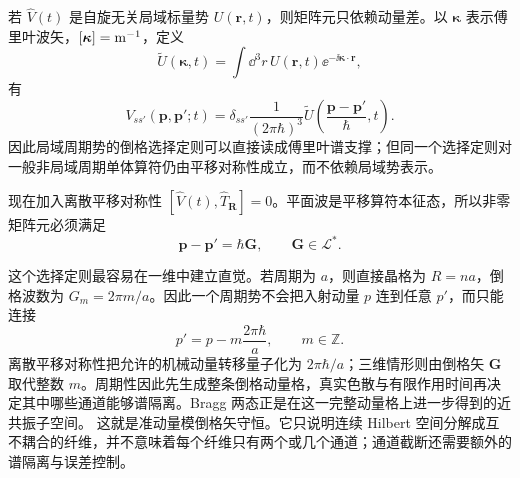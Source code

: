 若 $\hat V(t)$ 是自旋无关局域标量势 $U(\mathbf r,t)$，则矩阵元只依赖动量差。以 $\boldsymbol\kappa$ 表示傅里叶波矢，$[\boldsymbol\kappa]={\rm m^{-1}}$，定义
\begin{equation*}
\widetilde U(\boldsymbol\kappa,t)=\int\dd^3 r\,U(\mathbf r,t)\ee^{-\ii\boldsymbol\kappa\cdot\mathbf r},
\end{equation*}
有
\begin{equation*}
V_{ss'}(\mathbf p,\mathbf p';t)
=\delta_{ss'}\frac{1}{(2\pi\hbar)^3}
\widetilde U\!\left(\frac{\mathbf p-\mathbf p'}{\hbar},t\right).
\end{equation*}
因此局域周期势的倒格选择定则可以直接读成傅里叶谱支撑；但同一个选择定则对一般非局域周期单体算符仍由平移对称性成立，而不依赖局域势表示。

现在加入离散平移对称性 $[\hat V(t),\hat T_{\mathbf R}]=0$。平面波是平移算符本征态，所以非零矩阵元必须满足
\begin{equation}
\boxed{
\mathbf p-\mathbf p'=\hbar\mathbf G,
\qquad
\mathbf G\in\mathcal L^*.}
\label{eq:periodic_momentum_selection_rule}
\end{equation}

这个选择定则最容易在一维中建立直觉。若周期为 $a$，则直接晶格为 $R=na$，倒格波数为 $G_m=2\pi m/a$。因此一个周期势不会把入射动量 $p$ 连到任意 $p'$，而只能连接
\[
 p'=p-m\frac{2\pi\hbar}{a},\qquad m\in\mathbb Z.
\]
离散平移对称性把允许的机械动量转移量子化为 $2\pi\hbar/a$；三维情形则由倒格矢 $\mathbf G$ 取代整数 $m$。周期性因此先生成整条倒格动量格，真实色散与有限作用时间再决定其中哪些通道能够谱隔离。Bragg 两态正是在这一完整动量格上进一步得到的近共振子空间。
这就是准动量模倒格矢守恒。它只说明连续 Hilbert 空间分解成互不耦合的纤维，并不意味着每个纤维只有两个或几个通道；通道截断还需要额外的谱隔离与误差控制。

